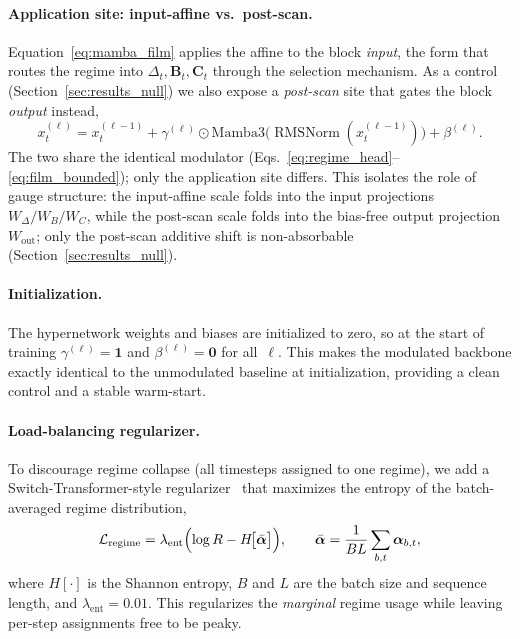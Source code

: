 \documentclass{article}
\DeclareMathOperator{\RMSNorm}{RMSNorm}
\begin{document}
\paragraph{Application site: input-affine vs.\ post-scan.}
Equation~\eqref{eq:mamba_film} applies the affine to the block \emph{input},
the form that routes the regime into $\Delta_t,\mathbf{B}_t,\mathbf{C}_t$
through the selection mechanism.  As a control (Section~\ref{sec:results_null})
we also expose a \emph{post-scan} site that gates the block \emph{output}
instead,
\begin{equation}\label{eq:mamba_film_postscan}
  x_t^{(\ell)} = x_t^{(\ell-1)}
  + \gamma^{(\ell)} \odot \mathrm{Mamba3}\!\bigl(\RMSNorm(x_t^{(\ell-1)})\bigr)
  + \beta^{(\ell)} .
\end{equation}
The two share the identical modulator (Eqs.~\eqref{eq:regime_head}--\eqref{eq:film_bounded});
only the application site differs.  This isolates the role of gauge structure:
the input-affine scale folds into the input projections $W_\Delta/W_B/W_C$,
while the post-scan scale folds into the bias-free output projection
$W_{\text{out}}$; only the post-scan additive shift is non-absorbable
(Section~\ref{sec:results_null}).

\paragraph{Initialization.}
The hypernetwork weights and biases are initialized to zero, so at the
start of training $\gamma^{(\ell)} = \mathbf{1}$ and
$\beta^{(\ell)} = \mathbf{0}$ for all~$\ell$.  This makes the modulated
backbone exactly identical to the unmodulated baseline at
initialization, providing a clean control and a stable warm-start.

\paragraph{Load-balancing regularizer.}
To discourage regime collapse (all timesteps assigned to one regime), we
add a Switch-Transformer-style
regularizer~\citep{fedus2022switch} that maximizes the entropy of the
batch-averaged regime distribution,
\begin{equation}\label{eq:load_balance}
  \mathcal{L}_{\text{regime}} = \lambda_{\text{ent}}
  \Bigl(\log R - H\!\bigl[\bar{\bm{\alpha}}\bigr]\Bigr),
  \qquad
  \bar{\bm{\alpha}} = \frac{1}{BL}\sum_{b,t} \bm{\alpha}_{b,t},
\end{equation}
where $H[\cdot]$ is the Shannon entropy, $B$ and $L$ are the batch size
and sequence length, and $\lambda_{\text{ent}} = 0.01$.  This
regularizes the \emph{marginal} regime usage while leaving per-step
assignments free to be peaky.
\end{document}

